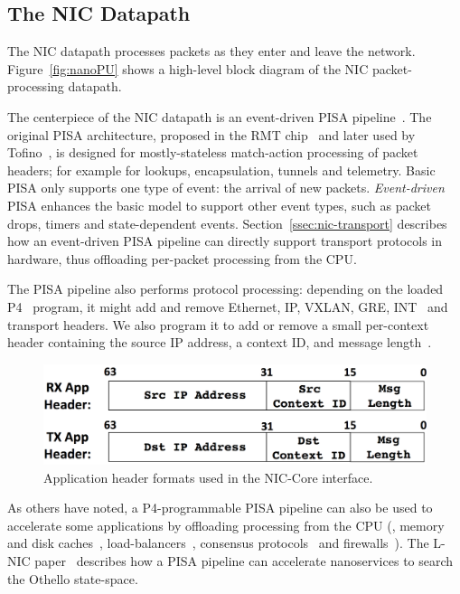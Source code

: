 \subsection{The NIC Datapath}
\label{ssec:nic-datapath}
The NIC datapath processes packets as they enter and leave the network.
Figure~\ref{fig:nanoPU} shows a high-level block diagram of the NIC packet-processing datapath.

The centerpiece of the NIC datapath is an event-driven PISA pipeline~\cite{event-driven-pisa}. 
The original PISA architecture, proposed in the RMT chip~\cite{RMT} and later used by Tofino~\cite{tofino}, is designed for mostly-stateless match-action processing of packet headers; for example for lookups, encapsulation, tunnels and telemetry.
Basic PISA only supports one type of event: the arrival of new packets. 
{\em Event-driven} PISA enhances the basic model to support other event types, such as packet drops, timers and state-dependent events. 
Section~\ref{ssec:nic-transport} describes how an event-driven PISA pipeline can directly support transport protocols in hardware, thus offloading per-packet processing from the CPU. 

The PISA pipeline also performs protocol processing: depending on the loaded P4~\cite{P4} program, it might add and remove Ethernet, IP, VXLAN, GRE, INT~\cite{INT} and transport headers. 
We also program it to add or remove a small per-context header containing the source IP address, a context ID, and message length~.

\begin{figure}
 \includegraphics[width=\linewidth]{./figures/app-headers}
 \caption{Application header formats used in the NIC-Core interface.}
 \label{fig:app-headers}
\end{figure}

As others have noted, a P4-programmable PISA pipeline can also be used to accelerate some applications by offloading processing from the CPU (\eg, memory and disk caches~\cite{netcache}, load-balancers~\cite{silkroad}, consensus protocols~\cite{netchain} and firewalls~\cite{p4-firewall}). 
The L-NIC paper~\cite{lnic} describes how a PISA pipeline can accelerate nanoservices to search the Othello state-space.
